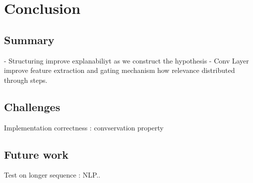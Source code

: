 \chapter{Conclusion}
\section{Summary}
- Structuring  improve explanabiliyt as we construct the hypothesis
- Conv Layer improve feature extraction and gating mechanism how relevance distributed through steps.


\section{Challenges}
Implementation correctness : convservation property 

\section{Future work}
Test on longer sequence : NLP.. 
